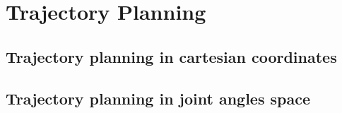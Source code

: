 \section{Trajectory Planning}

\subsection{Trajectory planning in cartesian coordinates}
\subsection{Trajectory planning in joint angles space}